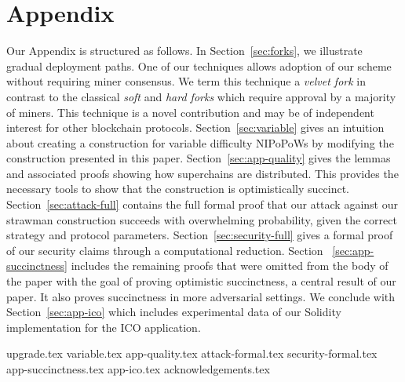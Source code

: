 \appendix
\section*{Appendix}

Our Appendix is structured as follows.
In Section~\ref{sec:forks}, we illustrate
gradual deployment paths. One of our techniques allows adoption of our scheme
without requiring miner consensus. We term this technique a \emph{velvet fork}
in contrast to the classical \emph{soft} and \emph{hard forks} which require
approval by a majority of miners. This technique is a novel contribution and may
be of independent interest for other blockchain protocols.
Section~\ref{sec:variable} gives an intuition about creating a construction for
variable difficulty NIPoPoWs by modifying the construction presented in this
paper.
Section~\ref{sec:app-quality} gives the lemmas and associated proofs showing how
superchains are distributed. This provides the necessary tools to show that the
construction is optimistically succinct. Section~\ref{sec:attack-full} contains
the full formal proof that our attack against our strawman construction succeeds with overwhelming probability, given the correct
strategy and protocol parameters. Section~\ref{sec:security-full} gives a formal
proof of our security claims through a computational reduction. Section~
\ref{sec:app-succinctness} includes the remaining proofs that were omitted from
the body of the paper with the goal of proving optimistic succinctness, a
central result of our paper. It also proves succinctness in more adversarial
settings. We conclude with
Section~\ref{sec:app-ico} which includes experimental data of our Solidity
implementation for the ICO application.

{upgrade.tex}
{variable.tex}
{app-quality.tex}
{attack-formal.tex}
{security-formal.tex}
{app-succinctness.tex}
{app-ico.tex}
{acknowledgements.tex}
